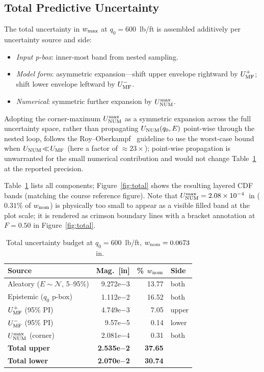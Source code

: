 \documentclass[10pt,twocolumn]{article}
\begin{document}
\subsection{Total Predictive Uncertainty}
\label{sec:total}

The total uncertainty in $w_{\rm max}$ at $q_0=600$~lb/ft is
assembled additively per uncertainty source and side:
\begin{itemize}[leftmargin=*, itemsep=0pt]
  \item \textit{Input p-box}: inner-most band from nested sampling.
  \item \textit{Model form}: asymmetric expansion—shift upper envelope
    rightward by $U_{\rm MF}^+$; shift lower envelope leftward by $U_{\rm MF}^-$.
  \item \textit{Numerical}: symmetric further expansion by $U_{\rm NUM}^{\rm max}$.
\end{itemize}
Adopting the corner-maximum $U_{\rm NUM}^{\rm max}$ as a symmetric
expansion across the full uncertainty space, rather than propagating
$U_{\rm NUM}(q_0,E)$ point-wise through the nested loop, follows the
Roy--Oberkampf~\cite{roy2011} guideline to use the worst-case bound
when $U_{\rm NUM}\!\ll\!U_{\rm MF}$ (here a factor of $\approx\!23\times$);
point-wise propagation is unwarranted for the small numerical
contribution and would not change Table~\ref{tab:budget} at the
reported precision.

Table~\ref{tab:budget} lists all components; Figure~\ref{fig:total}
shows the resulting layered CDF bands (matching the course reference figure).
Note that $U_{\rm NUM}^{\rm max}=2.08\times10^{-4}$~in ($0.31\%$ of $w_{\rm nom}$)
is physically too small to appear as a visible filled band at the plot scale; it is
rendered as crimson boundary lines with a bracket annotation at $F=0.50$ in
Figure~\ref{fig:total}.

\begin{table}[ht]
\centering
\caption{Total uncertainty budget at $q_0=600$~lb/ft,
  $w_{\rm nom}=0.0673$~in.}
\label{tab:budget}
\footnotesize
\setlength{\tabcolsep}{3pt}
\begin{tabular}{@{}p{2.8cm}rrp{0.9cm}@{}}
\toprule
Source & Mag.~[in] & \% $w_{\rm nom}$ & Side\\
\midrule
Aleatory ($E{\sim}\mathcal{N}$, 5--95\%) & 9.272e$-$3 & 13.77 & both\\
Epistemic ($q_0$ p-box) & 1.112e$-$2 & 16.52 & both\\
$U_{\rm MF}^+$ (95\% PI) & 4.749e$-$3 &  7.05 & upper\\
$U_{\rm MF}^-$ (95\% PI) & 9.57e$-$5  &  0.14 & lower\\
$U_{\rm NUM}^{\rm max}$ (corner) & 2.081e$-$4 &  0.31 & both\\
\midrule
\textbf{Total upper} & \textbf{2.535e$-$2} & \textbf{37.65} &\\
\textbf{Total lower} & \textbf{2.070e$-$2} & \textbf{30.74} &\\
\bottomrule
\end{tabular}
\end{table}
\end{document}
